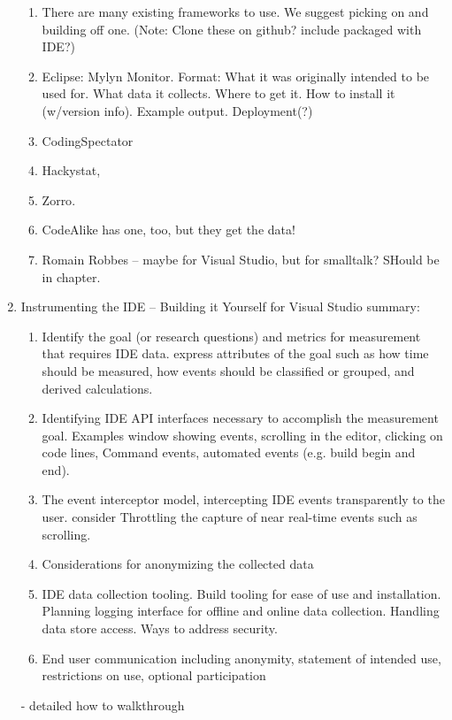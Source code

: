 \begin{enumerate}
\begin{enumerate}
	\item 
	There are many existing frameworks to use. We suggest picking on and building off one. (Note: Clone these on github? include packaged with IDE?)
	
	\item Eclipse: Mylyn Monitor. Format: What it was originally intended to be used for. What data it collects. Where to get it. How to install it (w/version info). Example output. Deployment(?)
	
	\item CodingSpectator %
	
	\item Hackystat\cite{V:johnson2003beyond}, %

	\item Zorro\cite{Kou2010Operational}. %
	
	\item CodeAlike has one, too, but they get the data!
	
	\item Romain Robbes -- maybe for Visual Studio, but for smalltalk? SHould be in chapter.
\end{enumerate}

  \item Instrumenting the IDE -- Building it Yourself for Visual Studio %
 summary:
\begin{enumerate}
	\item 
	Identify the goal (or research questions) and metrics for measurement that requires IDE data.  express attributes of the goal such as how time should be measured, how events should be classified or grouped, and derived calculations.
	\item
	Identifying  IDE API interfaces necessary to accomplish the measurement goal.  Examples window showing events, scrolling in the editor, clicking on code lines, Command events, automated events (e.g. build begin and end).
	\item
	The event interceptor model, intercepting IDE events transparently to the user.  consider Throttling the capture of near real-time events such as scrolling.
	\item
	Considerations for anonymizing the collected data
	\item
	IDE data collection tooling.  Build tooling for ease of use and installation.  Planning logging interface for offline and online data collection.  Handling data store access.  Ways to address security.  
	\item
	End user communication including anonymity, statement of intended use, restrictions on use, optional participation
	
\end{enumerate}
- detailed how to walkthrough 
  \end{enumerate}

